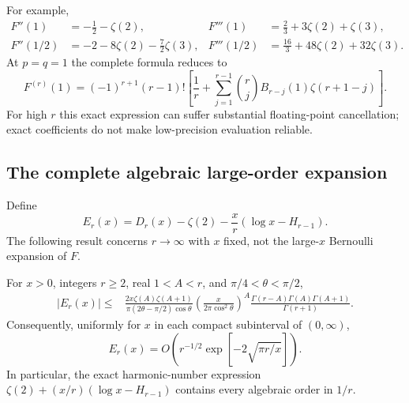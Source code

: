 For example,
\begin{align*}
 F''(1)&=-\frac12-\zeta(2),&
 F'''(1)&=\frac23+3\zeta(2)+\zeta(3),\\
 F''(1/2)&=-2-8\zeta(2)-\frac72\zeta(3),&
 F'''(1/2)&=\frac{16}3+48\zeta(2)+32\zeta(3).
\end{align*}
At $p=q=1$ the complete formula reduces to
\[
 F^{(r)}(1)=(-1)^{r+1}(r-1)!
 \left[\frac1r+
 \sum_{j=1}^{r-1}\binom rj B_{r-j}(1)\zeta(r+1-j)\right].
\]
For high $r$ this exact expression can suffer substantial floating-point
cancellation; exact coefficients do not make low-precision evaluation
reliable.

\subsection{The complete algebraic large-order expansion}

Define
\[
 E_r(x)=D_r(x)-\zeta(2)-\frac xr(\log x-H_{r-1}).
\]
The following result concerns $r\to\infty$ with $x$ fixed, not the
large-$x$ Bernoulli expansion of $F$.

\begin{theorem}\label{hergjet:thm:herglotz-bound}
For $x>0$, integers $r\ge2$, real $1<A<r$, and
$\pi/4<\theta<\pi/2$,
\begin{align*}
 |E_r(x)|\le{}&
 \frac{2x\zeta(A)\zeta(A+1)}
 {\pi(2\theta-\pi/2)\cos\theta}
 \left(\frac{x}{2\pi\cos^2\theta}\right)^A
 \frac{\Gamma(r-A)\Gamma(A)\Gamma(A+1)}{\Gamma(r+1)}.
\end{align*}
Consequently, uniformly for $x$ in each compact subinterval of $(0,\infty)$,
\[
 E_r(x)=O\left(r^{-1/2}\exp[-2\sqrt{\pi r/x}]\right).
\]
In particular, the exact harmonic-number expression
$\zeta(2)+(x/r)(\log x-H_{r-1})$ contains every algebraic order in $1/r$.
\end{theorem}

